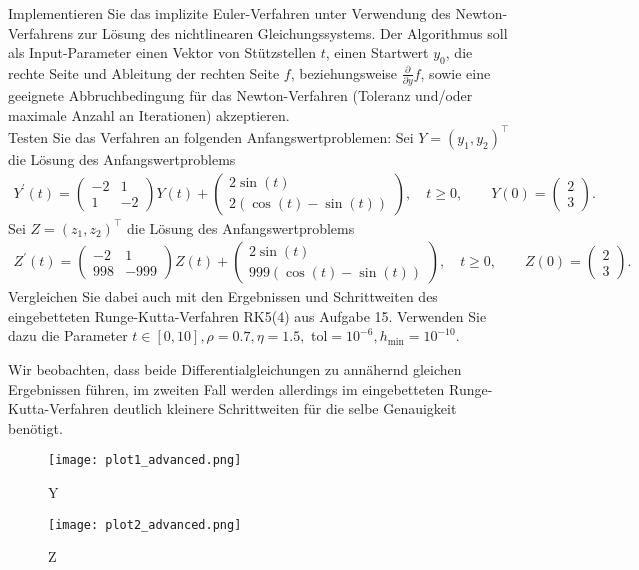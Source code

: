 \begin{exercise}
Implementieren Sie das implizite Euler-Verfahren unter Verwendung des Newton-Verfahrens
zur Lösung des nichtlinearen Gleichungssystems. Der Algorithmus soll als Input-Parameter
einen Vektor von Stützstellen $t$, einen Startwert $y_0$, die rechte Seite und Ableitung
der rechten Seite $f$, beziehungsweise $\frac{\partial}{\partial y} f$, sowie eine
geeignete Abbruchbedingung für das Newton-Verfahren (Toleranz und/oder maximale
Anzahl an Iterationen) akzeptieren. \\
Testen Sie das Verfahren an folgenden Anfangswertproblemen: Sei $Y = (y_1,y_2)^{\top}$
die Lösung des Anfangswertproblems
\begin{align}
  Y^{\prime}(t) = \begin{pmatrix}
    -2 & 1 \\
    1 & -2
  \end{pmatrix}Y(t) +
  \begin{pmatrix}
    2 \sin(t) \\ 2(\cos(t) - \sin(t))
  \end{pmatrix},\quad t \geq 0, \qquad
  Y(0) = \begin{pmatrix}
    2 \\ 3
  \end{pmatrix}.
\end{align}
Sei $Z = (z_1,z_2)^{\top}$ die Lösung des Anfangswertproblems
\begin{align}
Z^{\prime}(t) = \begin{pmatrix}
  -2 & 1 \\ 998 & -999
\end{pmatrix}Z(t) +
\begin{pmatrix}
  2\sin(t) \\ 999(\cos(t)-\sin(t))
\end{pmatrix}, \quad t \geq 0, \qquad
Z(0) = \begin{pmatrix}
  2 \\ 3
\end{pmatrix}.
\end{align}
Vergleichen Sie dabei auch mit den Ergebnissen und Schrittweiten des eingebetteten
Runge-Kutta-Verfahren RK5(4) aus Aufgabe 15. Verwenden Sie dazu die Parameter $t \in
[0,10], \rho = 0.7, \eta = 1.5,$ tol$=10^{-6}, h_{\min} = 10^{-10}$.
\end{exercise}
\begin{solution}
Wir beobachten, dass beide Differentialgleichungen zu annähernd gleichen Ergebnissen
führen, im zweiten Fall werden allerdings im eingebetteten Runge-Kutta-Verfahren
deutlich kleinere Schrittweiten für die selbe Genauigkeit benötigt.
\FloatBarrier
\begin{figure}
    \centering
    \texttt{[image: plot1\_advanced.png]}
    \caption{Y}
\end{figure}
\begin{figure}
    \centering
    \texttt{[image: plot2\_advanced.png]}
    \caption{Z}
\end{figure}
\end{solution}
